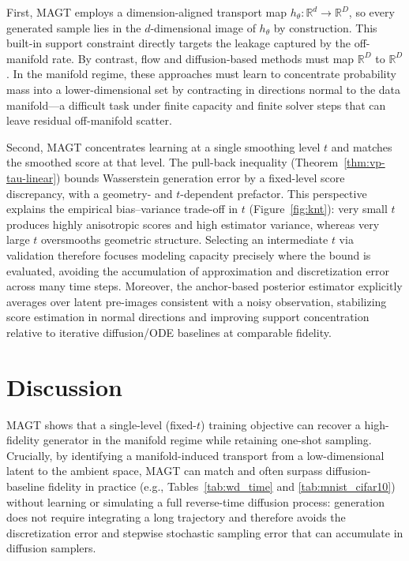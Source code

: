 \documentclass[12pt]{article}
\theoremstyle{definition} %
\providecommand{\method}{MAGT} %
\begin{document}
First, \method{} employs a dimension-aligned transport map $h_{\theta}:\mathbb{R}^d\to\mathbb{R}^D$, so every generated sample lies in the $d$-dimensional image of $h_{\theta}$ by construction.
This built-in support constraint directly targets the leakage captured by the off-manifold rate.
By contrast, flow and diffusion-based methods must map $\mathbb{R}^D$ to $\mathbb{R}^D$.
In the manifold regime, these approaches must learn to concentrate probability mass into a lower-dimensional set by contracting in directions normal to the data manifold---a difficult task under finite capacity and finite solver steps that can leave residual off-manifold scatter.

Second, \method{} concentrates learning at a single smoothing level $t$ and matches the smoothed score at that level.
The pull-back inequality (Theorem~\ref{thm:vp-tau-linear}) bounds Wasserstein generation error by a fixed-level score discrepancy, with a geometry- and $t$-dependent prefactor.
This perspective explains the empirical bias--variance trade-off in $t$ (Figure~\ref{fig:knt}): very small $t$ produces highly anisotropic scores and high estimator variance, whereas very large $t$ oversmooths geometric structure.
Selecting an intermediate $t$ via validation therefore focuses modeling capacity precisely where the bound is evaluated, avoiding the accumulation of approximation and discretization error across many time steps.
Moreover, the anchor-based posterior estimator explicitly averages over latent pre-images consistent with a noisy observation, stabilizing score estimation in normal directions and improving support concentration relative to iterative diffusion/ODE baselines at comparable fidelity.

\section{Discussion}
\label{sec:discussion}

\method{} shows that a single-level (fixed-$t$) training objective can recover a high-fidelity generator in the manifold regime while retaining one-shot sampling.
Crucially, by identifying a manifold-induced transport from a low-dimensional latent to the ambient space, \method{} can match and often surpass diffusion-baseline fidelity in practice (e.g., Tables~\ref{tab:wd_time} and \ref{tab:mnist_cifar10}) without learning or simulating a full reverse-time diffusion process:
generation does not require integrating a long trajectory and therefore avoids the discretization error and stepwise stochastic sampling error that can accumulate in diffusion samplers.
\end{document}
